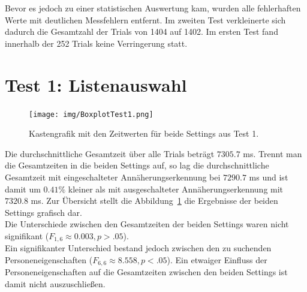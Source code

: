 \documentclass[12pt,numbers=noenddot,parskip,bibliography=totocnumbered,listof=totocnumbered]{scrreprt}
\begin{document}
Bevor es jedoch zu einer statistischen Auswertung kam, wurden alle fehlerhaften Werte mit deutlichen Messfehlern entfernt. Im zweiten Test verkleinerte sich dadurch die Gesamtzahl der Trials von 1404 auf 1402. Im ersten Test fand innerhalb der 252 Trials keine Verringerung statt. 

\section{Test 1: Listenauswahl}
\begin{figure}
\centering
\texttt{[image: img/BoxplotTest1.png]}
\caption{Kastengrafik mit den Zeitwerten für beide Settings aus Test 1.}
\label{ergebnistest1}
\end{figure}
Die durchschnittliche Gesamtzeit über alle Trials beträgt $7305.7$ ms. Trennt man die Gesamtzeiten in die beiden Settings auf, so lag die durchschnittliche Gesamtzeit mit eingeschalteter Annäherungserkennung bei $7290.7$ ms und ist damit um $0.41\%$ kleiner als mit ausgeschalteter Annäherungserkennung mit $7320.8$ ms. Zur Übersicht stellt die Abbildung~\ref{ergebnistest1} die Ergebnisse der beiden Settings grafisch dar.\\
Die Unterschiede zwischen den Gesamtzeiten der beiden Settings waren nicht signifikant ($F_{1,6}\approx 0.003, p > .05$).\\
Ein signifikanter Unterschied bestand jedoch zwischen den zu suchenden Personeneigenschaften ($F_{6,6}\approx 8.558, p < .05$). Ein etwaiger Einfluss der Personeneigenschaften auf die Gesamtzeiten zwischen den beiden Settings ist damit nicht auszuschließen.
\end{document}

